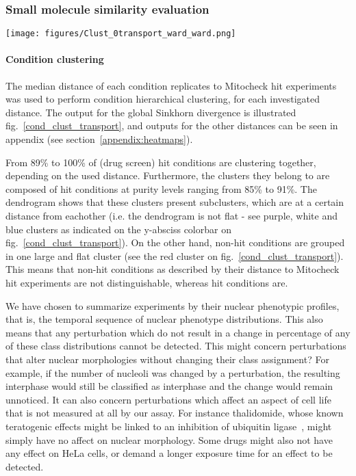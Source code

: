 \subsubsection{Small molecule similarity evaluation}

\begin{figure*}[ht!]
\centerline{\texttt{[image: figures/Clust\_0transport\_ward\_ward.png]}}

\caption{Drug screen condition - Mitocheck siRNA two-dimensional hierarchical clustering using global Sinkhorn divergence. Ward method was used in combination with the Euclidean distance.}
\label{cond_clust_transport}
\end{figure*}

\paragraph*{Condition clustering\\}
The median distance of each condition replicates to Mitocheck hit
experiments was used to perform condition hierarchical clustering, for
each investigated distance. The output for the global Sinkhorn
divergence is illustrated fig.~\ref{cond_clust_transport}, and outputs
for the other distances can be seen in appendix (see
section~\ref{appendix:heatmaps}). 

From 89\% to 100\% of (drug screen) hit conditions are clustering
together, depending on the used distance. Furthermore, the clusters
they belong to are composed of hit conditions at purity levels ranging
from 85\% to 91\%. The dendrogram shows that these clusters present
subclusters, which are at a certain distance from eachother (i.e. the
dendrogram is not flat - see purple, white and blue clusters as
indicated on the y-absciss colorbar on
fig.~\ref{cond_clust_transport}). On the other hand, non-hit
conditions are grouped in one large and flat cluster (see the red
cluster on fig.~\ref{cond_clust_transport}). This means that non-hit
conditions as described by their distance to Mitocheck hit experiments
are not distinguishable, whereas hit conditions are. 

We have chosen to summarize experiments by their nuclear phenotypic
profiles, that is, the temporal sequence of nuclear phenotype
distributions. This also means that any perturbation which do not result in
a change in percentage of any of these class distributions cannot be
detected. This might concern perturbations that alter nuclear
morphologies without changing their class assignment? For example, if the number of nucleoli was changed by a perturbation, the resulting interphase would still be classified as interphase and the change would remain unnoticed. It can also concern perturbations which affect an aspect of cell life that is
not measured at all by our assay. For instance thalidomide, whose known teratogenic
effects might be linked to an inhibition of ubiquitin ligase~\cite{pmid20223979}, might simply have no affect on nuclear morphology. Some drugs might also not have any effect on HeLa cells, or demand a longer exposure time for an effect to be detected. 

